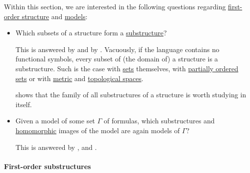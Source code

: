 \begin{remark}\label{rem:questions_regarding_structures}
  Within this section, we are interested in the following questions regarding \hyperref[def:first_order_structure]{first-order structure} and \hyperref[def:first_order_model]{models}:

  \begin{itemize}
    \item Which subsets of a structure form a \hyperref[def:first_order_substructure]{substructure}?

    This is answered by  and by . Vacuously, if the language contains no functional symbols, every subset of (the domain of) a structure is a substructure. Such is the case with \hyperref[def:set]{sets} themselves, with \hyperref[def:partially_ordered_set]{partially ordered sets} or with \hyperref[def:metric_space]{metric} and \hyperref[def:topological_space]{topological spaces}.

     shows that the family of all substructures of a structure is worth studying in itself.

    \item Given a model of some set \( \Gamma \) of formulas, which substructures and \hyperref[def:first_order_homomorphism]{homomorphic} images of the model are again models of \( \Gamma \)?

    This is answered by ,  and .
  \end{itemize}
\end{remark}

\paragraph{First-order substructures}

